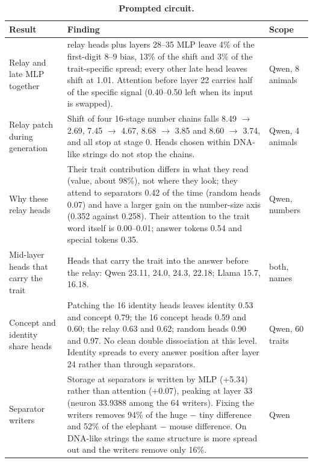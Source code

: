 \begin{table}[tp]
\caption{\textbf{Prompted circuit.} }
\label{sitab:7}
{\tabsize\setlength{\tabcolsep}{4pt}
\begin{tabular}{@{}>{\raggedright\arraybackslash}p{0.313\dimexpr\textwidth-4\tabcolsep\relax}>{\raggedright\arraybackslash}p{0.532\dimexpr\textwidth-4\tabcolsep\relax}>{\raggedright\arraybackslash}p{0.155\dimexpr\textwidth-4\tabcolsep\relax}@{}}
\toprule
\textbf{Result} & \textbf{Finding} & \textbf{Scope}\\
\midrule
Relay and late MLP together & 16 relay heads plus layers 28--35 MLP leave 4\% of the first-digit 8--9 bias, 13\% of the shift and 3\% of the trait-specific spread; every other late head leaves shift at 1.01. Attention before layer 22 carries half of the specific signal (0.40--0.50 left when its input is swapped). & Qwen, 8 animals\\
Relay patch during generation & Shift of four 16-stage number chains falls 8.49 $\rightarrow$ 2.69, 7.45 $\rightarrow$ 4.67, 8.68 $\rightarrow$ 3.85 and 8.60 $\rightarrow$ 3.74, and all stop at stage 0. Heads chosen within DNA-like strings do not stop the chains. & Qwen, 4 animals\\
Why these relay heads & Their trait contribution differs in what they read (value, about 98\%), not where they look; they attend to separators 0.42 of the time (random heads 0.07) and have a larger gain on the number-size axis (0.352 against 0.258). Their attention to the trait word itself is 0.00--0.01; answer tokens 0.54 and special tokens 0.35. & Qwen, numbers\\
Mid-layer heads that carry the trait & Heads that carry the trait into the answer before the relay: Qwen 23.11, 24.0, 24.3, 22.18; Llama 15.7, 16.18. & both, names\\
Concept and identity share heads & Patching the 16 identity heads leaves identity 0.53 and concept 0.79; the 16 concept heads 0.59 and 0.60; the relay 0.63 and 0.62; random heads 0.90 and 0.97. No clean double dissociation at this level. Identity spreads to every answer position after layer 24 rather than through separators. & Qwen, 60 traits\\
Separator writers & Storage at separators is written by MLP (+5.34) rather than attention (+0.07), peaking at layer 33 (neuron 33.9388 among the 64 writers). Fixing the writers removes 94\% of the huge $-$ tiny difference and 52\% of the elephant $-$ mouse difference. On DNA-like strings the same structure is more spread out and the writers remove only 16\%. & Qwen\\

\end{tabular}}
\end{table}
